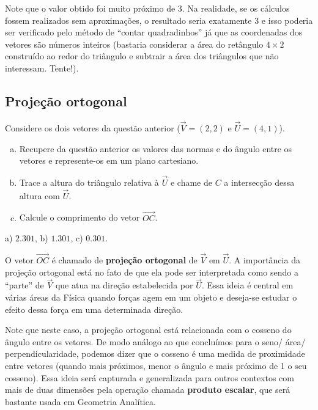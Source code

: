 \documentclass[main.tex]{subfiles}
\begin{document}
Note que o valor obtido foi muito próximo de 3. Na realidade, se os cálculos fossem realizados sem aproximações, o resultado seria exatamente 3 e isso poderia ser verificado pelo método de ``contar quadradinhos'' já que as coordenadas dos vetores são números inteiros (bastaria considerar a área do retângulo $4 \times 2$ construído ao redor do triângulo e subtrair a área dos triângulos que não interessam. Tente!).

\subsection*{Projeção ortogonal}

\begin{questao}
Considere os dois vetores da questão anterior ($\overrightarrow{V}=(2,2)$ e $\overrightarrow{U}=(4,1)$).
\begin{enumerate}[a)]
\item Recupere da questão anterior os valores das normas e do ângulo entre os vetores e represente-os em um plano cartesiano.
\item Trace a altura do triângulo relativa à $\overrightarrow{U}$ e chame de $C$ a intersecção dessa altura com $\overrightarrow{U}$.
\item Calcule o comprimento do vetor $\overrightarrow{OC}$.
\end{enumerate}
\end{questao}

\begin{gabarito}
	\begin{gabaritoQuestao}
		a) $2.301$, b) $1.301$, c) $0.301$.
	\end{gabaritoQuestao}
\end{gabarito}

O vetor $\overrightarrow{OC}$ é chamado de \textbf{projeção ortogonal} de $\overrightarrow{V}$ em $\overrightarrow{U}$. A importância da projeção ortogonal está no fato de que ela pode ser interpretada como sendo a ``parte'' de $\overrightarrow{V}$ que atua na direção estabelecida por $\overrightarrow{U}$. Essa ideia é central em várias áreas da Física quando forças agem em um objeto e deseja-se estudar o efeito dessa força em uma determinada direção.

Note que neste caso, a projeção ortogonal está relacionada com o cosseno do ângulo entre os vetores. De modo análogo ao que concluímos para o seno/ área/ perpendicularidade, podemos dizer que o cosseno é uma medida de proximidade entre vetores (quando mais próximos, menor o ângulo e mais próximo de 1 o seu cosseno). Essa ideia será capturada e generalizada para outros contextos com mais de duas dimensões pela operação chamada \textbf{produto escalar}, que será bastante usada em Geometria Analítica.
\end{document}
